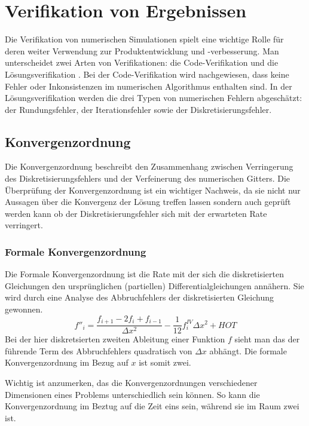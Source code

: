 \section{Verifikation von Ergebnissen}

Die Verifikation von numerischen Simulationen spielt eine wichtige Rolle
für deren weiter Verwendung zur Produktentwicklung und -verbesserung.
Man unterscheidet zwei Arten von Verifikationen: die Code-Verifikation und die Lösungsverifikation
\cite{veluri}.
Bei der Code-Verifikation wird nachgewiesen, dass keine Fehler oder Inkonsistenzen im numerischen
Algorithmus enthalten sind. In der Lösungsverifikation werden die drei Typen von numerischen Fehlern
abgeschätzt: der Rundungsfehler, der Iterationsfehler sowie der Diskretisierungsfehler.

\subsection{Konvergenzordnung}

Die Konvergenzordnung beschreibt den Zusammenhang zwischen Verringerung des Diskretisierungsfehlers
und der Verfeinerung des numerischen Gitters.
Die Überprüfung der Konvergenzordnung ist ein wichtiger Nachweis, da sie nicht nur Aussagen über
die Konvergenz der Lösung treffen lassen sondern auch geprüft werden kann ob der Diskretisierungsfehler
sich mit der erwarteten Rate verringert.

\subsubsection{Formale Konvergenzordnung}

Die Formale Konvergenzordnung ist die Rate mit der sich die diskretisierten Gleichungen
den ursprünglichen (partiellen) Differentialgleichungen annähern.
Sie wird durch eine Analyse des Abbruchfehlers
der diskretisierten Gleichung gewonnen.
\begin{equation}
  f''_i = \frac{f_{i+1}-2f_i +f_{i-1}}{\Delta x^2} -\frac{1}{12} f^{IV}_i \Delta x^2 + HOT
\end{equation}
Bei der hier diskretsierten zweiten Ableitung einer Funktion $f$ sieht man das der führende
Term des Abbruchfehlers quadratisch von $\Delta x$ abhängt. Die formale Konvergenzordnung im Bezug
auf $x$ ist somit zwei.

Wichtig ist anzumerken, das die Konvergenzordnungen verschiedener Dimensionen
eines Problems unterschiedlich sein können. So kann die Konvergenzordnung im Beztug auf die Zeit eins sein,
während sie im Raum zwei ist.


